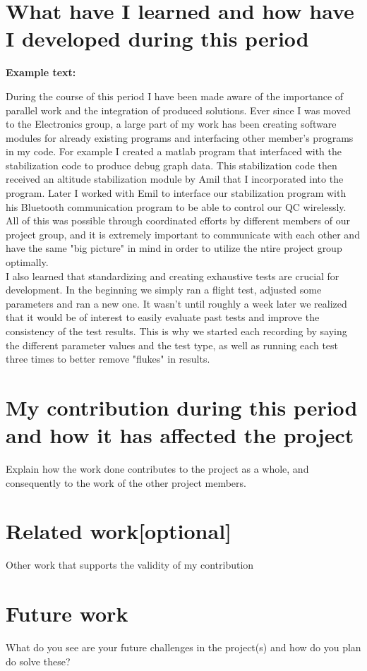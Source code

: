\documentclass{article}
\begin{document}
\section*{What have I learned and how have I developed during this period}
\textbf{Example text:}

During the course of this period I have been made aware of the importance of parallel work and the integration of produced solutions. Ever since I was moved to the Electronics group, a large part of my work has been creating software modules for already existing programs and interfacing other member's programs in my code. For example I created a matlab program that interfaced with the stabilization code to produce debug graph data. This stabilization code then received an altitude stabilization module by Amil that I incorporated into the program. Later I worked with Emil to interface our stabilization program with his Bluetooth communication program to be able to control our QC wirelessly. All of this was possible through coordinated efforts by different members of our project group, and it is extremely important to communicate with each other and have the same "big picture" in mind in order to utilize the ntire project group optimally.\\ 
I also learned that standardizing and creating exhaustive tests are crucial for development. In the beginning we simply ran a flight test, adjusted some parameters and ran a new one. It wasn't until roughly a week later we realized that it would be of interest to easily evaluate past tests and improve the consistency of the test results. This is why we started each recording by saying the different parameter values and the test type, as well as running each test three times to better remove "flukes" in results.  

\section*{My contribution during this period and how it has affected the project}
Explain how the work done contributes to the project as a whole, and consequently to the work of the other project members.


\section*{Related work[optional]}
Other work that supports the validity of my contribution%

\section*{Future work}
What do you see are your future challenges in the project(s) and how do you plan do solve these?
\end{document}
